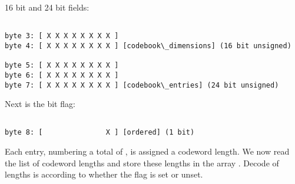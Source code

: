 16 bit  and 24 bit  fields:

\begin{Verbatim}[commandchars=\\\{\}]

byte 3: [ X X X X X X X X ]
byte 4: [ X X X X X X X X ] [codebook\_dimensions] (16 bit unsigned)

byte 5: [ X X X X X X X X ]
byte 6: [ X X X X X X X X ]
byte 7: [ X X X X X X X X ] [codebook\_entries] (24 bit unsigned)

\end{Verbatim}

Next is the \varname{[ordered]} bit flag:

\begin{Verbatim}[commandchars=\\\{\}]

byte 8: [               X ] [ordered] (1 bit)

\end{Verbatim}

Each entry, numbering a
total of , is assigned a codeword length.
We now read the list of codeword lengths and store these lengths in
the array . Decode of lengths is
according to whether the \varname{[ordered]} flag is set or unset.


